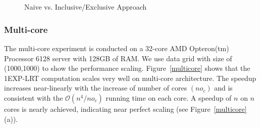 \documentclass[10pt,journal,cspaper,compsoc]{IEEEtran}
\newcommand\bigo{\mathcal O}
\begin{document}
\begin{figure}[h]
\centering
{}\\
~~
\caption{Naive vs. Inclusive/Exclusive Approach}\label{fast}
\end{figure}
\subsubsection{Multi-core}
 The multi-core experiment is conducted on a 32-core AMD Opteron(tm) Processor 6128 server with 128GB of RAM. We use data grid with size of (1000,1000) to show the performance scaling. Figure~\ref{multicore} shows that the 1EXP-LRT computation scales very well on multi-core architecture.  The speedup increases near-linearly with the increase of number of cores $(no_c)$ and is consistent with the $\bigo(n^4/no_c)$ running time on each core. A speedup of $n$ on $n$ cores is nearly achieved, indicating near perfect scaling (see Figure~\ref{multicore}(a)).
\end{document}
